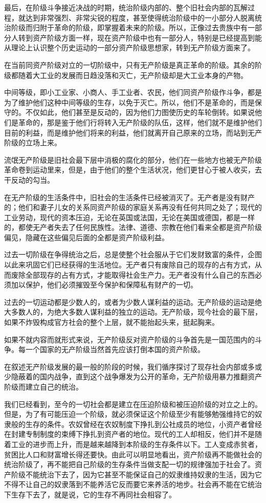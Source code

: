 \documentclass[UTF8,zihao=-4,a4paper]{ctexart}
\begin{document}
最后，在阶级斗争接近决战的时期，统治阶级内部的、整个旧社会内部的瓦解过程，就达到非常强烈、非常尖锐的程度，甚至使得统治阶级中的一小部分人脱离统治阶级而归附于革命的阶级，即掌握着未来的阶级。所以，正像过去贵族中有一部分人转到资产阶级方面一样，现在资产阶级中也有一部分人，特别是已经提高到能从理论上认识整个历史运动的一部分资产阶级思想家，转到无产阶级方面来了。\par
在当前同资产阶级对立的一切阶级中，只有无产阶级是真正革命的阶级。其余的阶级都随着大工业的发展而日趋没落和灭亡，无产阶级却是大工业本身的产物。\par
中间等级，即小工业家、小商人、手工业者、农民，他们同资产阶级作斗争，都是为了维护他们这种中间等级的生存，以免于灭亡。所以，他们不是革命的，而是保守的。不仅如此，他们甚至是反动的，因为他们力图使历史的车轮倒转。如果说他们是革命的，那是鉴于他们行将转入无产阶级的队伍，这样，他们就不是维护他们目前的利益，而是维护他们将来的利益，他们就离开自己原来的立场，而站到无产阶级的立场上来。\par
流氓无产阶级是旧社会最下层中消极的腐化的部分，他们在一些地方也被无产阶级革命卷到运动里来，但是，由于他们的整个生活状况，他们更甘心于被人收买，去干反动的勾当。\par
在无产阶级的生活条件中，旧社会的生活条件已经被消灭了。无产者是没有财产的；他们和妻子儿女的关系同资产阶级的家庭关系再没有任何共同之处了；现代的工业劳动，现代的资本压迫，无论在英国或法国，无论在美国或德国，都是一样的，都使无产者失去了任何民族性。法律、道德、宗教在他们看来全都是资产阶级偏见，隐藏在这些偏见后面的全都是资产阶级利益。\par
过去一切阶级在争得统治之后，总是使整个社会服从于它们发财致富的条件，企图以此来巩固它们已经获得的生活地位。无产者只有废除自己的现存的占有方式，从而废除全部现存的占有方式，才能取得社会生产力。无产者没有什么自己的东西必须加以保护，他们必须摧毁至今保护和保障私有财产的一切。\par
过去的一切运动都是少数人的，或者为少数人谋利益的运动。无产阶级的运动是绝大多数人的，为绝大多数人谋利益的独立的运动。无产阶级，现今社会的最下层，如果不炸毁构成官方社会的整个上层，就不能抬起头来，挺起胸来。\par
如果不就内容而就形式来说，无产阶级反对资产阶级的斗争首先是一国范围内的斗争。每一个国家的无产阶级当然首先应该打倒本国的资产阶级。\par
在叙述无产阶级发展的最一般的阶段的时候，我们循序探讨了现存社会内部或多或少隐蔽着的国内战争，直到这个战争爆发为公开的革命，无产阶级用暴力推翻资产阶级而建立自己的统治。\par
我们已经看到，至今的一切社会都是建立在压迫阶级和被压迫阶级的对立之上的。但是，为了有可能压迫一个阶级，就必须保证这个阶级至少有能够勉强维持它的奴隶般的生存的条件。农奴曾经在农奴制度下挣扎到公社成员的地位，小资产者曾经在封建专制制度的束缚下挣扎到资产者的地位。现代的工人却相反，他们并不是随着工业的进步而上升，而是越来越降到本阶级的生存条件以下。工人变成赤贫者，贫困比人口和财富增长得还要快。由此可以明显地看出，资产阶级再不能做社会的统治阶级了，再不能把自己阶级的生存条件当做支配一切的规律强加于社会了。资产阶级不能统治下去了，因为它甚至不能保证自己的奴隶维持奴隶的生活，因为它不得不让自己的奴隶落到不能养活它反而要它来养活的地步。社会再不能在它统治下生存下去了，就是说，它的生存不再同社会相容了。\par
\end{document}
